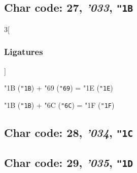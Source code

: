 \documentclass{article}
\newlength{\maxcharwidth}
\begin{document}
\subsection{Char code: 27, {\it'033}, {\tt"1B}}
\label{char_27}


\begin{multicols}{3}[\subsubsection{Ligatures}]

{\testfont\char"1B\noboundary} ({\tt"1B}) + {\testfont\char"69\noboundary} ({\tt"69}) = {\testfont\char"1E\noboundary} ({\tt"1E}) 

{\testfont\char"1B\noboundary} ({\tt"1B}) + {\testfont\char"6C\noboundary} ({\tt"6C}) = {\testfont\char"1F\noboundary} ({\tt"1F}) 

\end{multicols}

\subsection{Char code: 28, {\it'034}, {\tt"1C}}
\label{char_28}


\subsection{Char code: 29, {\it'035}, {\tt"1D}}
\label{char_29}

\end{document}
